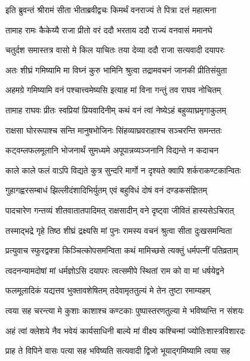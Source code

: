 \twolineshloka
{इति ब्रुवन्तं श्रीरामं सीता भीताब्रवीद्वचः}
{किमर्थं वनराज्यं ते पित्रा दत्तं महात्मना} %

\twolineshloka
{तामाह रामः कैकेय्यै राजा प्रीतो वरं ददौ}
{भरताय ददौ राज्यं वनवासं ममानघे} %

\twolineshloka
{चतुर्दश समास्तत्र वासो मे किल याचितः}
{तया देव्या ददौ राजा सत्यवादी दयापरः} %

\twolineshloka
{अतः शीघ्रं गमिष्यामि मा विघ्नं कुरु भामिनि}
{श्रुत्वा तद्रामवचनं जानकी प्रीतिसंयुता} %

\twolineshloka
{अहमग्रे गमिष्यामि वनं पश्चात्त्वमेष्यसि}
{इत्याह मां विना गन्तुं तव राघव नोचितम्} %

\twolineshloka
{तामाह राघवः प्रीतः स्वप्रियां प्रियवादिनीम्}
{कथं वनं त्वां नेष्येऽहं बहुव्याघ्रमृगाकुलम्} %

\twolineshloka
{राक्षसा घोररूपाश्च सन्ति मानुषभोजिनः}
{सिंहव्याघ्रवराहाश्च सञ्चरन्ति समन्ततः} %

\twolineshloka
{कट्वम्लफलमूलानि भोजनार्थं सुमध्यमे}
{अपूपान्नव्यञ्जनानि विद्यन्ते न कदाचन} %

\twolineshloka
{काले काले फलं वाऽपि विद्यते कुत्र सुन्दरि}
{मार्गो न दृश्यते क्वापि शर्कराकण्टकान्वितः} %

\twolineshloka
{गुहागह्वरसम्बाधं झिल्लीदंशादिभिर्युतम्}
{एवं बहुविधं दोषं वनं दण्डकसंज्ञितम्} %

\twolineshloka
{पादचारेण गन्तव्यं शीतवातातपादिमत्}
{राक्षसादीन् वने दृष्ट्वा जीवितं हास्यसेऽचिरात्} %

\twolineshloka
{तस्माद्भद्रे गृहे तिष्ठ शीघ्रं द्रक्ष्यसि मां पुनः}
{रामस्य वचनं श्रुत्वा सीता दुःखसमन्विता} %

\twolineshloka
{प्रत्युवाच स्फुरद्वक्त्रा किञ्चित्कोपसमन्विता}
{कथं मामिच्छसे त्यक्तुं धर्मपत्नीं पतिव्रताम्} %

\twolineshloka
{त्वदनन्यामदोषां मां धर्मज्ञोऽसि दयापरः}
{त्वत्समीपे स्थितां राम को वा मां धर्षयेद्वने} %

\twolineshloka
{फलमूलादिकं यद्यत्तव भुक्तावशेषितम्}
{तदेवामृततुल्यं मे तेन तुष्टा रमाम्यहम्} %

\twolineshloka
{त्वया सह चरन्त्या मे कुशाः काशाश्च कण्टकाः}
{पुष्पास्तरणतुल्या मे भविष्यन्ति न संशयः} %

\twolineshloka
{अहं त्वां क्लेशये नैव भवेयं कार्यसाधिनी}
{बाल्ये मां वीक्ष्य कश्चिन्मां ज्योतिःशास्त्रविशारदः} %

\twolineshloka
{प्राह ते विपिने वासः पत्या सह भविष्यति}
{सत्यवादी द्विजो भूयाद्गमिष्यामि त्वया सह} %

